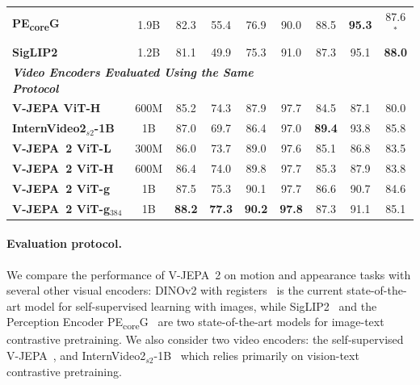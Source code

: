 \documentclass[]{fairmeta}
\newcommand{\model}{V-JEPA~2\xspace}
\newcommand{\oldModel}{V-JEPA\xspace}
\begin{document}
\begin{table}[t]
{\begin{tabular}{l c c |c c c | c c c}
        {\bf PE\textsubscript{core}G}~{\tiny\citep{bolya_perception_encoder_2025}} & 1.9B & 82.3 & 55.4 & 76.9 & 90.0 & 88.5 & \bf 95.3 & 87.6$^*$\\
        {\bf SigLIP2}{\tiny~\citep{tschannen2025siglip}} & 1.2B & 81.1 & 49.9 & 75.3 & 91.0 & 87.3 & 95.1 & \bf 88.0 \\
        \midrule
        \multicolumn{6}{l}{\bf\it Video Encoders Evaluated Using the Same Protocol }\\[1ex]
        {\bf \oldModel ViT-H}~{\tiny\citep{bardes2024revisiting}}  & 600M & 85.2 & 74.3 & 87.9 & 97.7 & 84.5 & 87.1 & 80.0 \\
        {\bf InternVideo2$_{s2}$-1B}~{\tiny\citep{wang2024internvideo2}} & 1B & 87.0 & 69.7 & 86.4 & 97.0 & \bf 89.4 & 93.8 & 85.8 \\
        \midrule
        \bf \model ViT-L  & 300M & 86.0 & 73.7 & 89.0 & 97.6 & 85.1 & 86.8 & 83.5 \\
        \bf \model ViT-H  & 600M & 86.4 & 74.0 & 89.8 & 97.7 & 85.3 & 87.9 & 83.8 \\
        \bf \model ViT-g  & 1B &  87.5 & 75.3 & 90.1 & 97.7 & 86.6 & 90.7 & 84.6 \\
        \bf \model ViT-g$_{384}$  & 1B & \bf 88.2  &\bf 77.3 & \bf 90.2 & \bf 97.8 & 87.3  & 91.1 & 85.1 \\
\end{tabular}}
\end{table}


\paragraph{\bf Evaluation protocol.}
We compare the performance of \model on motion and appearance tasks with several other visual encoders: DINOv2 with registers~\citep{darcet2024vision} is the current state-of-the-art model for self-supervised learning with images, while SigLIP2~\citep{tschannen2025siglip} and the Perception Encoder PE\textsubscript{core}G~\citep{bolya_perception_encoder_2025} are two state-of-the-art models for image-text contrastive pretraining. We also consider two video encoders: the self-supervised \oldModel~\citep{bardes2024revisiting}, and InternVideo2$_{s2}$-1B~\citep{wang2024internvideo2} which relies primarily on vision-text contrastive pretraining.
\end{document}
